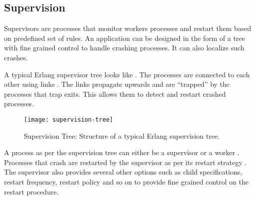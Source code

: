 \subsection{Supervision}
\label{section:concepts.supervision}

Supervisors are processes that monitor workers processes and restart them based
on predefined set of rules. An application can be designed in the form of a
tree with fine grained control to handle crashing processes. It can also
localize such crashes.

A typical Erlang supervisor tree looks like . The
processes are connected to each other using links%
. The links propagate upwards and are ``trapped'' by the processes that trap
exits. This allows them to detect and restart crashed processes.

\begin{figure}
  \texttt{[image: supervision-tree]}
  \caption[Supervision Tree]{%
    Supervision Tree: Structure of a typical Erlang supervision tree.}
  \label{figure:supervision.tree}
  \normalcaption
\end{figure}

A process as per the supervision tree can either be a supervisor%
or a worker%
. Processes that crash are restarted by the supervisor as per its
restart strategy%
. The supervisor also provides several other options such as child
specifications, restart frequency, restart policy and so on to provide
fine grained control on the restart procedure.

